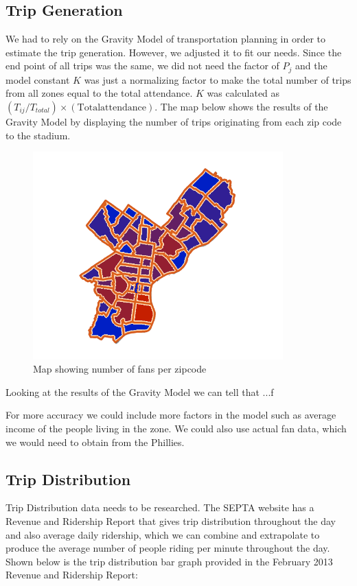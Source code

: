 
\subsection{Trip Generation}

We had to rely on the Gravity Model of transportation planning in
order to estimate the trip generation. However, we adjusted it to fit
our needs. Since the end point of all trips was the same, we did not
need the factor of $P_j$ and the model constant $K$ was just a
normalizing factor to make the total number of trips from all zones
equal to the total attendance. $K$ was calculated as
$(T_{ij}/T_{total}) \times (\mathrm{Total attendance})$. The map below
shows the results of the Gravity Model by displaying the number of
trips originating from each zip code to the stadium.

\begin{figure}[htp]
  \centering
  \includegraphics[height=8cm]{graphics/trip-generation.png}
  \caption{Map showing number of fans per zipcode}
  \label{fig-trip-generation-results}
\end{figure}

Looking at the results of the Gravity Model we can tell that ...f

For more accuracy we could include more factors in the model such as
average income of the people living in the zone. We could also use
actual fan data, which we would need to obtain from the Phillies.


\subsection{Trip Distribution}

Trip Distribution data needs to be researched. The SEPTA website has a
Revenue and Ridership Report that gives trip distribution throughout
the day and also average daily ridership, which we can combine and
extrapolate to produce the average number of people riding per minute
throughout the day. Shown below is the trip distribution bar graph
provided in the February 2013 Revenue and Ridership Report:

